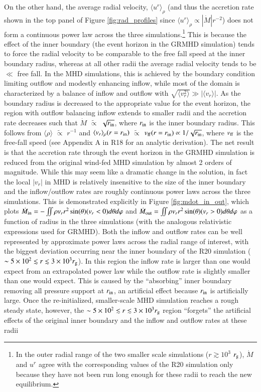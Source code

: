 \documentclass[twocolumn,twocolappendix,apjl,appendixfloats]{aastex63}
\begin{document}
On the other hand, the average radial velocity, $\langle u^r \rangle_\rho$ (and thus the accretion rate shown in the top panel of Figure \ref{fig:rad_profiles} since $\langle u^r \rangle_\rho \propto |\dot M|r^{-2}$) does not form a continuous power law across the three simulations.\footnote{In the outer radial range of the two smaller scale simulations ($r \gtrsim 10^3$ $r_{\rm g}$), $\dot M$ and $u^r$ agree with the corresponding values of the R20 simulation only because they have not been run long enough for these radii to reach the new equilibrium. }  This is because the effect of the inner boundary (the event horizon in the GRMHD simulation) tends to force the radial velocity to be comparable to the free fall speed at the inner boundary radius, whereas at all other radii the average radial velocity tends to be $\ll$ free fall. In the MHD simulations, this is achieved by the boundary condition limiting outflow and modestly enhancing inflow, while most of the domain is characterized by a balance of inflow and outflow with $\sqrt{\langle v_r^2\rangle} \gg |\langle v_r\rangle|$.   As the boundary radius is decreased to the appropriate value for the event horizon, the region with outflow balancing inflow extends to smaller radii and the accretion rate decreases such that $\dot M$ $\tilde \propto$ $\sqrt{r_{\rm in}}$, where $r_{\rm in}$ is the inner boundary radius.  This follows from $\langle \rho \rangle$ $\tilde \propto$ $r^{-1}$ and $\langle v_r \rangle_\rho (r= r_{\rm in})$ $\tilde \propto$ $v_{\rm ff}(r=r_{\rm in}) \propto 1/\sqrt{r_{\rm in}}$, where $v_{\rm ff}$ is the free-fall speed (see Appendix A in R18 for an analytic derivation).  The net result is that the accretion rate through the event horizon in the GRMHD simulation is reduced from the original wind-fed MHD simulation by almost 2 orders of magnitude.  While this may seem like a dramatic change in the solution, in fact the local $|v_r|$ in MHD is relatively insensitive to the size of the inner boundary and the inflow/outflow rates are roughly continuous power laws across the three simulations.  This is demonstrated explicitly in Figure \ref{fig:mdot_in_out}, which plots $\dot M_{\rm in} = -\iint \rho v_r r^2 \sin(\theta) (v_r <0)d\theta d\varphi$ and $\dot M_{\rm out} = \iint \rho v_r r^2 \sin(\theta) (v_r >0)d\theta d\varphi $ as a function of radius in the three simulations (with the analogous relativistic expressions used for GRMHD).   Both the inflow and outflow rates can be well represented by approximate power laws across the radial range of interest, with the biggest deviation occurring near the inner boundary of the R20 simulation ($\sim 5 \times 10^{2} \lesssim r \lesssim 3 \times 10^3 r_{\rm g}$).  In this region the inflow rate is larger than one would expect from an extrapolated power law while the outflow rate is slightly smaller than one would expect. This is caused by the ``absorbing'' inner boundary removing all pressure support at $r_{\rm in}$, an artificial effect because $r_{\rm in}$ is artificially large.  Once the re-initialized, smaller-scale MHD simulation reaches a rough steady state, however, the $\sim 5 \times 10^{2} \lesssim r \lesssim 3 \times 10^3 r_{\rm g}$ region ``forgets'' the artificial effects of the original inner boundary and the inflow and outflow rates at these radii  
\end{document}
